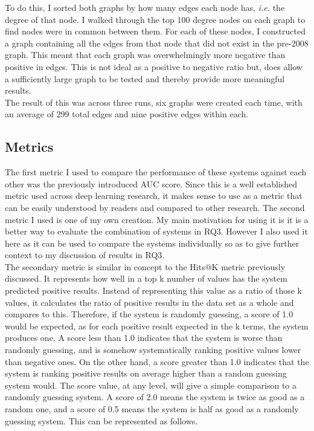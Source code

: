 \documentclass{l4proj}
\begin{document}
To do this, I sorted both graphs by how many edges each node has, \textit{i.e.} the degree of that node. I walked through the top 100 degree nodes on each graph to find nodes were in common between them. For each of these nodes, I constructed a graph containing all the edges from that node that did not exist in the pre-2008 graph. This meant that each graph was overwhelmingly more negative than positive in edges. This is not ideal as a positive to negative ratio but, does allow a sufficiently large graph to be tested and thereby provide more meaningful results. \\ 

The result of this was across three runs, six graphs were created each time, with an average of 299 total edges and nine positive edges within each. \\

\subsection{Metrics}

The first metric I used to compare the performance of these systems against each other was the previously introduced AUC score. Since this is a well established metric used across deep learning research, it makes sense to use as a metric that can be easily understood by readers and compared to other research. The second metric I used is one of my own creation. My main motivation for using it is it is a better way to evaluate the combination of systems in RQ3. However I also used it here as it can be used to compare the systems individually so as to give further context to my discussion of results in RQ3. \\ 

The secondary metric is similar in concept to the Hits@K metric previously discussed. It represents how well in a top k number of values has the system predicted positive results. Instead of representing this value as a ratio of those k values, it calculates the ratio of positive results in the data set as a whole and compares to this. Therefore, if the system is randomly guessing, a score of 1.0 would be expected, as for each positive result expected in the k terms, the system produces one. A score less than 1.0 indicates that the system is worse than randomly guessing, and is somehow systematically ranking positive values lower than negative ones. On the other hand, a score greater than 1.0 indicates that the system is ranking positive results on average higher than a random guessing system would. The score value, at any level, will give a simple comparison to a randomly guessing system. A score of 2.0 means the system is twice as good as a random one, and a score of 0.5 means the system is half as good as a randomly guessing system. This can be represented as follows.\\
\end{document}
